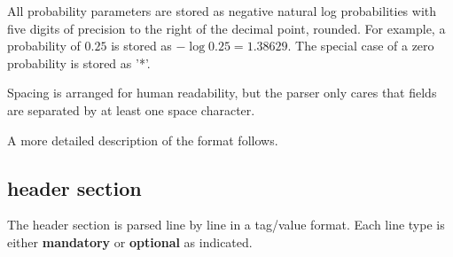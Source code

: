 All probability parameters are stored as negative natural log
probabilities with five digits of precision to the right of the
decimal point, rounded. For example, a probability of $0.25$ is stored
as $-\log 0.25 = 1.38629$. The special case of a zero probability is
stored as '*'.

Spacing is arranged for human readability, but the parser only cares
that fields are separated by at least one space character.

A more detailed description of the format follows.

\subsection{header section}

The header section is parsed line by line in a tag/value format. Each
line type is either \textbf{mandatory} or \textbf{optional} as
indicated. 

